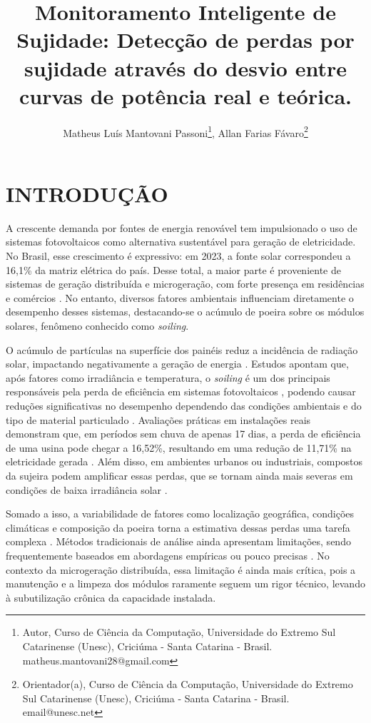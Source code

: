\documentclass{UNESC}
\title{Monitoramento Inteligente de Sujidade:
Detecção de perdas por sujidade através do desvio entre curvas de potência real e teórica.}
\author
{
   Matheus Luís Mantovani Passoni\footnote{Autor, Curso de Ciência da Computação, Universidade do Extremo Sul Catarinense (Unesc), Criciúma - Santa Catarina - Brasil. matheus.mantovani28@gmail.com},
   Allan Farias Fávaro\footnote{Orientador(a), Curso de Ciência da Computação, Universidade do Extremo Sul Catarinense (Unesc), Criciúma - Santa Catarina - Brasil. email@unesc.net}
}
\begin{document}
\onehalfspacing

\maketitle


\section{INTRODUÇÃO}

A crescente demanda por fontes de energia renovável tem impulsionado o uso de sistemas fotovoltaicos como alternativa sustentável para geração de eletricidade. No Brasil, esse crescimento é expressivo: em 2023, a fonte solar correspondeu a 16,1\% da matriz elétrica do país. Desse total, a maior parte é proveniente de sistemas de geração distribuída e microgeração, com forte presença em residências e comércios \cite{Tramontin_Rampinelli_2024}. No entanto, diversos fatores ambientais influenciam diretamente o desempenho desses sistemas, destacando-se o acúmulo de poeira sobre os módulos solares, fenômeno conhecido como \textit{soiling}.

O acúmulo de partículas na superfície dos painéis reduz a incidência de radiação solar, impactando negativamente a geração de energia \cite{Araujo_Marques}. Estudos apontam que, após fatores como irradiância e temperatura, o \textit{soiling} é um dos principais responsáveis pela perda de eficiência em sistemas fotovoltaicos \cite{Tramontin_Rampinelli_2024}, podendo causar reduções significativas no desempenho dependendo das condições ambientais e do tipo de material particulado \cite{john2016, jaszczur2020}. Avaliações práticas em instalações reais demonstram que, em períodos sem chuva de apenas 17 dias, a perda de eficiência de uma usina pode chegar a 16,52\%, resultando em uma redução de 11,71\% na eletricidade gerada \cite{Araujo_Marques}. Além disso, em ambientes urbanos ou industriais, compostos da sujeira podem amplificar essas perdas, que se tornam ainda mais severas em condições de baixa irradiância solar \cite{Tramontin_Rampinelli_2024}.

Somado a isso, a variabilidade de fatores como localização geográfica, condições climáticas e composição da poeira torna a estimativa dessas perdas uma tarefa complexa \cite{Araujo_Marques}. Métodos tradicionais de análise ainda apresentam limitações, sendo frequentemente baseados em abordagens empíricas ou pouco precisas \cite{abuzaid2022}. No contexto da microgeração distribuída, essa limitação é ainda mais crítica, pois a manutenção e a limpeza dos módulos raramente seguem um rigor técnico, levando à subutilização crônica da capacidade instalada.
\end{document}
